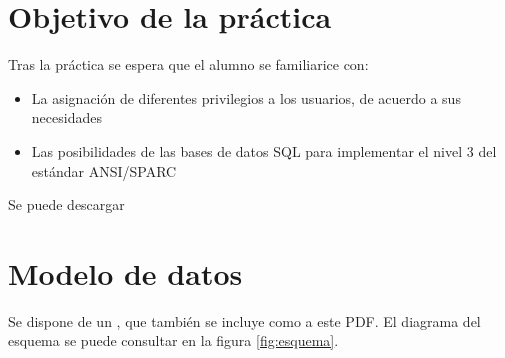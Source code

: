 
\usepackage{eurosym}




\renewcommand{\hmwkTitle}{Modificación concurente de datos}
\renewcommand{\hmwkClass}{Gestión de Bases de Datos}

\usepackage{enumitem}%


\setlength{\columnseprule}{0.4pt}
\newcommand{\Simultaneo}[2]{
  \begin{multicols}{2}
    #1
    \vfill \null
    \columnbreak
    #2
    \vfill \null
  \end{multicols}
}






\primerapagina


\section{Objetivo de la práctica}
Tras la práctica se espera que el alumno se familiarice con:
\begin{itemize}
\item La asignación de diferentes privilegios a los usuarios, de acuerdo a sus necesidades
\item Las posibilidades de las bases de datos SQL para implementar el nivel 3 del estándar ANSI/SPARC
\end{itemize}

Se puede descargar 

\section{Modelo de datos}

Se dispone de un , que también se incluye como  a este PDF. El diagrama del esquema se puede consultar en la figura \ref{fig:esquema}.

